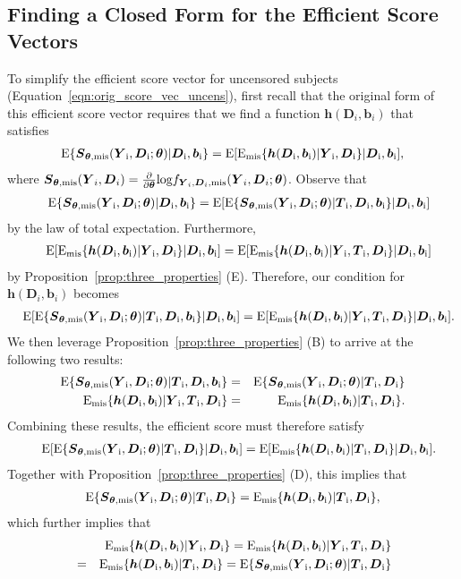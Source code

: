 \documentclass[12pt]{article}
\def\log{\hbox{log}}
\def\bse{\begin{eqnarray*}}
\def\ese{\end{eqnarray*}}
\def\bse{\begin{eqnarray*}}
\def\ese{\end{eqnarray*}}
\def\bS{{\mathbf S}}
\def\btheta{{\boldsymbol{\theta}}}
\def\bb{{\boldsymbol b}}
\def\bh{{\boldsymbol h}}
\def\bD{{\boldsymbol D}}
\def\bS{{\boldsymbol S}}
\def\bT{{\boldsymbol T}}
\def\bY{{\boldsymbol Y}}
\def\tilD{\bD}
\def\E{\rm E}
\begin{document}
\subsection{Finding a Closed Form for the Efficient Score Vectors}
\label{sec:simplify}
To simplify the efficient score vector for uncensored subjects (Equation~\eqref{eqn:orig_score_vec_uncens}), first recall that the original form of this efficient score vector requires that we find a function $\bh(\tilD_i,\bb_i)$ that satisfies
\bse
\E\{\bS_{\btheta, \rm{mis}}(\bY_i,\tilD_i;\btheta)|\tilD_i,\bb_{i}\}=\E[\E_{\rm{mis}}\{\bh(\tilD_i,\bb_{i})|\bY_i,\tilD_i\}|\tilD_i,\bb_{i}],
\ese
where $\bS_{\btheta,\rm{mis}}(\bY_i,\tilD_i)=\frac{\partial}{\partial \btheta}\log f_{\bY_i,\tilD_i,\rm{mis}}(\bY_i,\tilD_i;\btheta)$. Observe that
\bse
&&\E\{\bS_{\btheta, \rm{mis}}(\bY_i,\tilD_i;\btheta)|\tilD_i,\bb_i\}
=E[\E\{\bS_{\btheta, \rm{mis}}(\bY_i,\tilD_i;\btheta)|\bT_i,\tilD_i,\bb_i\}|\tilD_i,\bb_i]
\ese
by the law of total expectation. Furthermore,
\bse
&&\E[\E_{\rm{mis}}\{\bh(\tilD_i,\bb_i)|\bY_i,\tilD_i\}|\tilD_i,\bb_i]=\E[\E_{\rm{mis}}\{\bh(\tilD_i,\bb_i)|\bY_i,\bT_i,\tilD_i\}|\tilD_i,\bb_i]
\ese
by Proposition~\ref{prop:three_properties} (E). Therefore, our condition for $\bh(\tilD_i,\bb_{i})$ becomes
\bse
&&\E[\E\{\bS_{\btheta, \rm{mis}}(\bY_i,\tilD_i;\btheta)|\bT_i,\tilD_i,\bb_i\}|\tilD_i,\bb_i]=
\E[\E_{\rm{mis}}\{\bh(\tilD_i,\bb_i)|\bY_i,\bT_i,\tilD_i\}|\tilD_i,\bb_i].
\ese
We then leverage Proposition~\ref{prop:three_properties} (B) to arrive at the following two results: 
\bse
\E\{\bS_{\btheta, \rm{mis}}(\bY_i,\tilD_i;\btheta)|\bT_i,\tilD_i,\bb_i\}&=&\E\{\bS_{\btheta, \rm{mis}}(\bY_i,\tilD_i;\btheta)|\bT_i,\tilD_i\}\\
\E_{\rm{mis}}\{\bh(\tilD_i,\bb_i)|\bY_i,\bT_i,\tilD_i\}&=&
\E_{\rm{mis}}\{\bh(\tilD_i,\bb_i)|\bT_i,\tilD_i\}.
\ese
Combining these results, the efficient score must therefore satisfy
\bse
&&\E[\E\{\bS_{\btheta, \rm{mis}}(\bY_i,\tilD_i;\btheta)|\bT_i,\tilD_i\}|\tilD_i,\bb_i]=\E[\E_{\rm{mis}}\{\bh(\tilD_i,\bb_i)|\bT_i,\tilD_i\}|\tilD_i,\bb_i].
\ese
Together with Proposition~\ref{prop:three_properties} (D), this implies that 
\bse
\E\{\bS_{\btheta, \rm{mis}}(\bY_i,\tilD_i;\btheta)|\bT_i,\tilD_i\}=\E_{\rm{mis}}\{\bh(\tilD_i,\bb_i)|\bT_i,\tilD_i\},
\ese
which further implies that
\bse
&&\E_{\rm{mis}}\{\bh(\tilD_i,\bb_i)|\bY_i,\tilD_i\}=\E_{\rm{mis}}\{\bh(\tilD_i,\bb_i)|\bY_i,\bT_i,\tilD_i\}\\
&=&\E_{\rm{mis}}\{\bh(\tilD_i,\bb_i)|\bT_i,\tilD_i\}=\E\{\bS_{\btheta, \rm{mis}}(\bY_i,\tilD_i;\btheta)|\bT_i,\tilD_i\}
\ese
\end{document}
